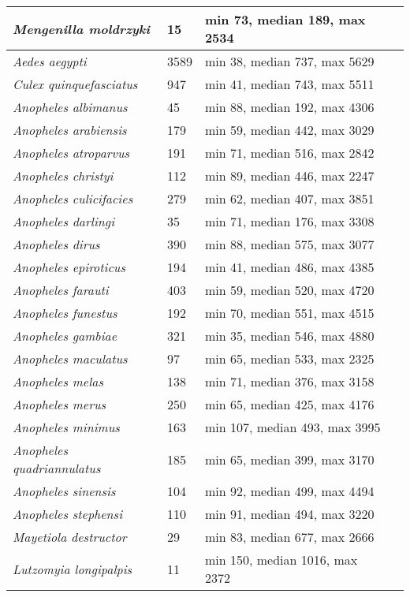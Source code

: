 {\begin{longtable}{| L{4cm} | L{2cm}  | L{5cm} | L{4cm} |}
\textit{Mengenilla moldrzyki} & 15 & min 73, median 189, max 2534 & \\ \hline
\textit{Aedes aegypti} & 3589 & min 38, median 737, max 5629 & \\ \hline
\textit{Culex quinquefasciatus} & 947 & min 41, median 743, max 5511 & \\ \hline
\textit{Anopheles albimanus} & 45 & min 88, median 192, max 4306 & \\ \hline
\textit{Anopheles arabiensis} & 179 & min 59, median 442, max 3029 & \\ \hline
\textit{Anopheles atroparvus} & 191 & min 71, median 516, max 2842 & \\ \hline
\textit{Anopheles christyi} & 112 & min 89, median 446, max 2247 & \\ \hline
\textit{Anopheles culicifacies} & 279 & min 62, median 407, max 3851 & \\ \hline
\textit{Anopheles darlingi} & 35 & min 71, median 176, max 3308 & \\ \hline
\textit{Anopheles dirus} & 390 & min 88, median 575, max 3077 & \\ \hline
\textit{Anopheles epiroticus} & 194 & min 41, median 486, max 4385 & \\ \hline
\textit{Anopheles farauti} & 403 & min 59, median 520, max 4720 & \\ \hline
\textit{Anopheles funestus} & 192 & min 70, median 551, max 4515 & \\ \hline
\textit{Anopheles gambiae} & 321 & min 35, median 546, max 4880 & \\ \hline
\textit{Anopheles maculatus} & 97 & min 65, median 533, max 2325 & \\ \hline
\textit{Anopheles melas} & 138 & min 71, median 376, max 3158 & \\ \hline
\textit{Anopheles merus} & 250 & min 65, median 425, max 4176 & \\ \hline
\textit{Anopheles minimus} & 163 & min 107, median 493, max 3995 & \\ \hline
\textit{Anopheles quadriannulatus} & 185 & min 65, median 399, max 3170 & \\ \hline
\textit{Anopheles sinensis} & 104 & min 92, median 499, max 4494 & \\ \hline
\textit{Anopheles stephensi} & 110 & min 91, median 494, max 3220 & \\ \hline
\textit{Mayetiola destructor} & 29 & min 83, median 677, max 2666 & \\ \hline
\textit{Lutzomyia longipalpis} & 11 & min 150, median 1016, max 2372 & \\ \hline

\end{longtable}}
